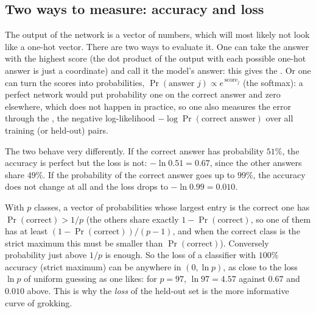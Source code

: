 \subsection{Two ways to measure: accuracy and loss}\label{sec:L5-accloss}
The output of the network is a vector of numbers, which will most likely not look like a one-hot vector. There are two ways to evaluate it. One can take the answer with the highest score (the dot product of the output with each possible one-hot answer is just a coordinate) and call it the model's answer: this gives the . Or one can turn the scores into probabilities, $\Pr(\text{answer }j)\propto e^{\,\text{score}_j}$ (the softmax): a perfect network would put probability one on the correct answer and zero elsewhere, which does not happen in practice, so one also measures the error through the , the negative log-likelihood $-\log\Pr(\text{correct answer})$ over all training (or held-out) pairs.

The two behave very differently. If the correct answer has probability $51\%$, the accuracy is perfect but the loss is not: $-\ln0.51=0.67$, since the other answers share $49\%$. If the probability of the correct answer goes up to $99\%$, the accuracy does not change at all and the loss drops to $-\ln0.99=0.010$.

\begin{beyond}
With $p$ classes, a vector of probabilities whose largest entry is the correct one has $\Pr(\text{correct})>1/p$ (the others share exactly $1-\Pr(\text{correct})$, so one of them has at least $(1-\Pr(\text{correct}))/(p-1)$, and when the correct class is the strict maximum this must be smaller than $\Pr(\text{correct})$). Conversely probability just above $1/p$ is enough. So the loss of a classifier with $100\%$ accuracy (strict maximum) can be anywhere in $(0,\ln p)$, as close to the loss $\ln p$ of uniform guessing as one likes: for $p=97$, $\ln97=4.57$ against $0.67$ and $0.010$ above. This is why the \emph{loss} of the held-out set is the more informative curve of grokking.
\end{beyond}

